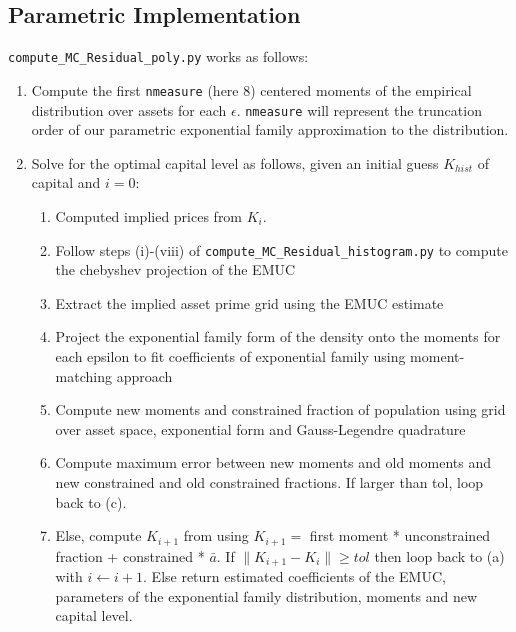 \documentclass[11pt]{article}
\newcommand{\code}[1]{\texttt{#1}}
\begin{document}
\subsection{Parametric Implementation}
\code{compute\_MC\_Residual\_poly.py} works as follows: 
\begin{enumerate}
	
\item Compute the first \code{nmeasure} (here 8) centered moments of the empirical distribution over assets for each $\epsilon$. \code{nmeasure} will represent the truncation order of our parametric exponential family approximation to the distribution.

\item 	Solve for the optimal capital level as follows, given an initial guess $K_{hist}$ of capital and $i=0$:
\begin{enumerate}
\item Computed implied prices from $K_i$.
\item Follow steps (i)-(viii) of \code{compute\_MC\_Residual\_histogram.py} to compute the chebyshev projection of the EMUC
\item Extract the implied asset prime grid using the EMUC estimate
\item Project the exponential family form of the density onto the moments for each epsilon to fit coefficients of exponential family using moment-matching approach
\item Compute new moments and constrained fraction of population using grid over asset space, exponential form and Gauss-Legendre quadrature
\item Compute maximum error between new moments and old moments and new constrained and old constrained fractions. If larger than tol, loop back to (c). 
\item Else, compute $K_{i+1}$ from using $K_{i+1} = $ first moment *  unconstrained fraction + constrained * $\bar{a}$. If $\lVert K_{i+1} - K_{i}\rVert \geq  tol$ then loop back to (a) with $i \leftarrow i+1$.  Else return estimated coefficients of the EMUC, parameters of the exponential family distribution, moments and new capital level. 

\end{enumerate}
\end{enumerate}
\printbibliography
\end{document}
